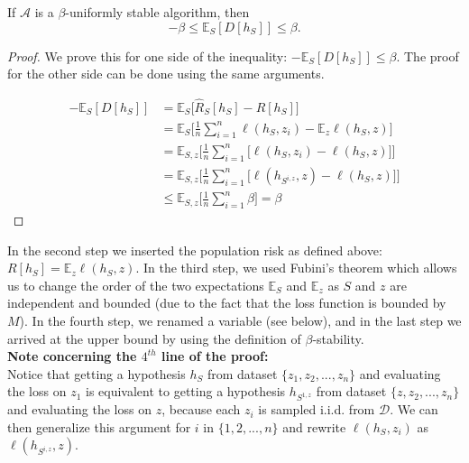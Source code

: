 \documentclass{article}
\begin{document}
\begin{thm}\label{defec_bound}
If $\mathcal{A}$ is a $\beta$-uniformly stable algorithm, then 
\[
	-\beta \le \mathbb{E}_{S}[D[h_S]] \le \beta.
\]
\end{thm}
\begin{proof}
We prove this for one side of the inequality:  
	 $-\mathbb{E}_{S}[D[h_S]] \le \beta$. The proof for the other side can be done using the same arguments.

\begin{align*}
    -\mathbb{E}_S[D[h_S]]
    &=\mathbb{E}_S\Big[
    \hat R_S[h_S]-R[h_S]\Big]\\
    &=\mathbb{E}_S
    \Big[\frac{1}{n}\sum_{i=1}^n \ell(h_S,z_{i})-\mathbb{E}_z\ell(h_S,z)\Big]\\
    &=\mathbb{E}_{S,z}
    \Big[\frac{1}{n}\sum_{i=1}^n \Big[\ell(h_S,z_{i})-\ell(h_S,z)\Big]\Big]\\
    &=\mathbb{E}_{S,z}
    \Big[\frac{1}{n}\sum_{i=1}^n \Big[\ell(h_{S^{i,z}},z)-\ell(h_S,z)\Big]\Big]\\
    &\leq \mathbb{E}_{S,z}
    \Big[\frac{1}{n}\sum_{i=1}^n\beta\Big]=\beta
\end{align*}	 
\end{proof}
In the second step we inserted the population risk as defined above: $R[h_S]=\mathbb{E}_z\ell(h_S,z)$. In the third step, we used Fubini's theorem which allows us to change the order of the two expectations $\mathbb{E}_{S}$ and $\mathbb{E}_{z}$ as $S$ and $z$ are independent and bounded (due to the fact that the loss function is bounded by $M$). In the fourth step, we renamed a variable (see below), and in the last step we arrived at the upper bound by using the definition of $\beta$-stability. \\

\textbf{Note concerning the $4^{th}$ line of the proof:} \\ 
Notice that getting a hypothesis $h_S$ from dataset $\{z_1, z_2,..., z_n\}$ and evaluating the loss on $z_1$ is equivalent to getting a hypothesis $h_{S^{1,z}}$ from dataset $\{z, z_2,..., z_n\}$ and evaluating the loss on $z$, because each $z_i$ is sampled i.i.d. from $\mathcal{D}$. We can then generalize this argument for $i$ in $\{1, 2,..., n\}$ and rewrite $\ell(h_S,z_{i})$ as $\ell(h_{S^{i,z}},z)$.\\

\end{document}
